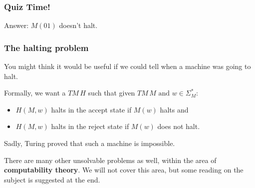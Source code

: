 \documentclass[aspectratio=169]{beamer}
\begin{document}
\begin{frame}[noframenumbering]
\frametitle{Quiz Time!}

\begin{center}
\end{center}

Answer: $M(01)$ doesn't halt.
\end{frame}

\begin{frame}
\frametitle{The halting problem}
You might think it would be useful if we could tell when a machine was going to halt.

Formally, we want a $TM\, H$ such that given $TM\, M \text{ and } w \in \Sigma_M^*$:

\begin{itemize}
    \item $H(M, w)$ halts in the accept state if $M(w)$ halts and
    \item $H(M, w)$ halts in the reject state if $M(w)$ does not halt.
\end{itemize}

Sadly, Turing proved that such a machine is impossible.

There are many other unsolvable problems as well, within the area of {\bf computability theory}. We will not cover this area, but some reading on the subject is suggested at the end.
\end{frame}
\end{document}
